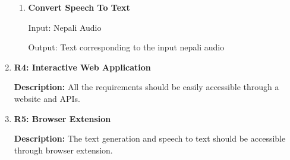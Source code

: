 \begin{enumerate}[font=\bfseries]
          \begin{enumerate}
            \item \textbf{Convert Speech To Text}
            
                  Input: Nepali Audio
                  
                  Output: Text corresponding to the input nepali audio  
          \end{enumerate}

    \item \textbf{R4: Interactive Web Application}
    
          \textbf{Description:} All the requirements should be easily accessible through a website and APIs.

          \item \textbf{R5: Browser Extension}
          
          \textbf{Description:} The text generation and speech to text should be accessible through browser extension.
\end{enumerate}

